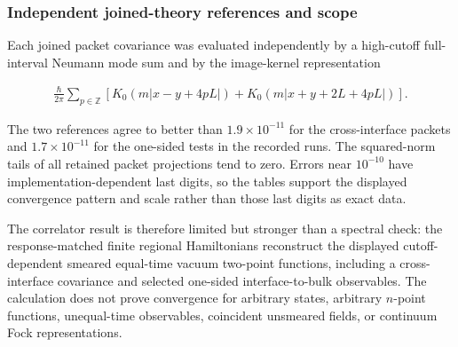 \subsubsection{Independent joined-theory references and scope}\label{subsubsec:correlator-references}

Each joined packet covariance was evaluated independently by a high-cutoff full-interval Neumann mode sum and by the image-kernel representation

\begin{align}
\frac{\hbar}{2\pi}
\sum_{p\in\mathbb Z}
\left[
K_0\left(m|x-y+4pL|\right)
+K_0\left(m|x+y+2L+4pL|\right)
\right].
\end{align}

The two references agree to better than $1.9\times10^{-11}$ for the cross-interface packets and $1.7\times10^{-11}$ for the one-sided tests in the recorded runs. The squared-norm tails of all retained packet projections tend to zero. Errors near $10^{-10}$ have implementation-dependent last digits, so the tables support the displayed convergence pattern and scale rather than those last digits as exact data.

The correlator result is therefore limited but stronger than a spectral check: the response-matched finite regional Hamiltonians reconstruct the displayed cutoff-dependent smeared equal-time vacuum two-point functions, including a cross-interface covariance and selected one-sided interface-to-bulk observables. The calculation does not prove convergence for arbitrary states, arbitrary $n$-point functions, unequal-time observables, coincident unsmeared fields, or continuum Fock representations.
